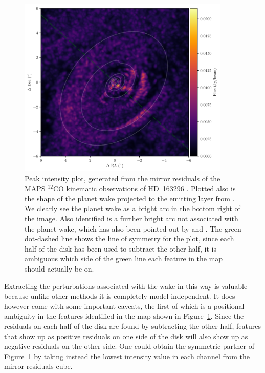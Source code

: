 \begin{figure}
    \centering
    \includegraphics[width = 0.9\textwidth]{figures/mirror_M8.pdf}
    \caption{Peak intensity plot, generated from the mirror residuals of the MAPS $^{12}$CO kinematic observations of HD~163296 \citep{oberg2021}. Plotted also is the shape of the planet wake projected to the emitting layer from \citet{calcino2022}. We clearly see the planet wake as a bright arc in the bottom right of the image. Also identified is a further bright arc not associated with the planet wake, which has also been pointed out by \citet{teague2021} and \citet{calcino2022}. The green dot-dashed line shows the line of symmetry for the plot, since each half of the disk has been used to subtract the other half, it is ambiguous which side of the green line each feature in the map should actually be on.}
    \label{fig:mirror_M8}
\end{figure}

Extracting the perturbations associated with the wake in this way is valuable because unlike other methods \citep{teague2021,teague2022} it is completely model-independent.
It does however come with some important caveats, the first of which is a positional ambiguity in the features identified in the map shown in Figure~\ref{fig:mirror_M8}.
Since the residuals on each half of the disk are found by subtracting the other half, features that show up as positive residuals on one side of the disk will also show up as negative residuals on the other side.
One could obtain the symmetric partner of Figure~\ref{fig:mirror_M8} by taking instead the lowest intensity value in each channel from the mirror residuals cube.


